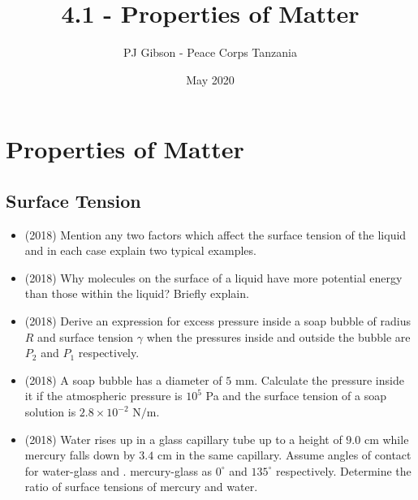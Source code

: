 \documentclass{article}
\title{4.1 - Properties of Matter}
\author{PJ Gibson - Peace Corps Tanzania}
\date{May 2020}
\begin{document}
\maketitle


\section{Properties of Matter}

\subsection{Surface Tension}
\begin{itemize}
\item (2018)  Mention any two factors which affect the surface tension of the liquid and in each case explain two typical examples. 
\item (2018)  Why molecules on the surface of a liquid have more potential energy than those within the liquid? Briefly explain. 
\item (2018)  Derive an expression for excess pressure inside a soap bubble of radius $ R$ and surface tension $ \gamma $ when the pressures inside and outside the bubble are $ P_{2}$ and $ P_{1}$ respectively. 
\item (2018)  A soap bubble has a diameter of $ 5$ mm. Calculate the pressure inside it if the atmospheric pressure is $ 10^{5}$ Pa and the surface tension of a soap solution is $ 2.8 \times 10^{-2}$ N$/$m.
\item (2018)  Water rises up in a glass capillary tube up to a height of $ 9.0$ cm while mercury falls down by $ 3.4$ cm in the same capillary. Assume angles of contact for water-glass and . mercury-glass as $ 0^{\circ}$ and $ 135^{\circ}$ respectively. Determine the ratio of surface tensions of mercury and water. 
\end{itemize}
\end{document}
